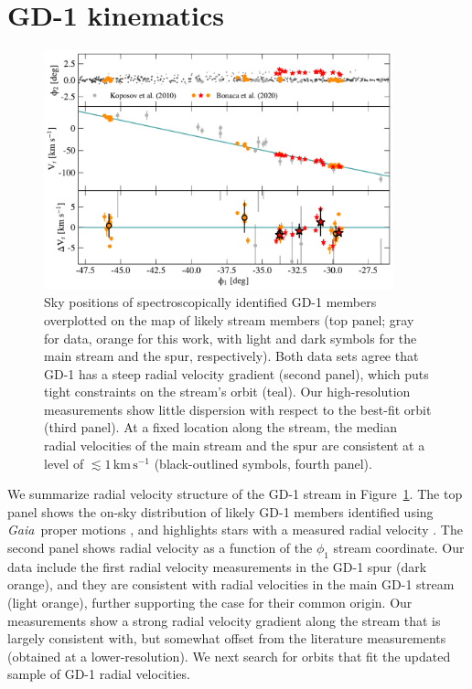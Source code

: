 \documentclass[twocolumn]{aastex63}
\newcommand{\gaia}{\textsl{Gaia}}
\newcommand{\kms}{\ensuremath{\textrm{km}\,\textrm{s}^{-1}}}
\begin{document}
\section{GD-1 kinematics}
\label{sec:kinematics}

\begin{figure}
\begin{center}
\includegraphics[width=0.9\textwidth]{gd1_kinematics.pdf}
\end{center}
\caption{Sky positions of spectroscopically identified GD-1 members overplotted on the map of likely stream members (top panel; gray for \citet{koposov2010} data, orange for this work, with light and dark symbols for the main stream and the spur, respectively).
Both data sets agree that GD-1 has a steep radial velocity gradient (second panel), which puts tight constraints on the stream's orbit (teal).
Our high-resolution measurements show little dispersion with respect to the best-fit orbit (third panel).
At a fixed location along the stream, the median radial velocities of the main stream and the spur are consistent at a level of $\lesssim1\,\kms$ (black-outlined symbols, fourth panel).
}
\label{fig:vr}
\end{figure}

We summarize radial velocity structure of the GD-1 stream in Figure~\ref{fig:vr}.
The top panel shows the on-sky distribution of likely GD-1 members identified using \gaia\ proper motions \citep[small points,][]{pwb}, and highlights stars with a measured radial velocity \citep[orange for this work, gray for literature data from][]{koposov2010}.
The second panel shows radial velocity as a function of the $\phi_1$ stream coordinate.
Our data include the first radial velocity measurements in the GD-1 spur (dark orange), and they are consistent with radial velocities in the main GD-1 stream (light orange), further supporting the case for their common origin.
Our measurements show a strong radial velocity gradient along the stream that is largely consistent with, but somewhat offset from the literature measurements (obtained at a lower-resolution).
We next search for orbits that fit the updated sample of GD-1 radial velocities.
\end{document}
